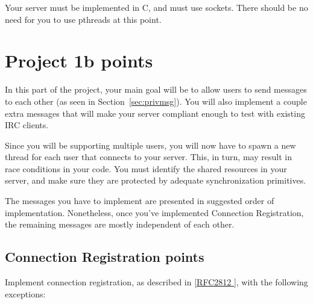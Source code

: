 \documentclass[10pt]{article}
\newcommand{\RFCsection}[2]{\href{http://tools.ietf.org/html/rfc#1\#section-#2}{[RFC#1 \textsection #2]}}
\newcommand{\points}[1]{{\sffamily\mdseries\guillemotleft #1 points\guillemotright{}}}
\begin{document}
Your server must be implemented in C, and must use sockets. There should be no need for you to use pthreads at this point.

\pagebreak

\section{Project 1b \points{100}}
\label{sec:proj1b}

In this part of the project, your main goal will be to allow users to send messages to each other (as seen in Section~\ref{sec:privmsg}). You will also implement a couple extra messages that will make your server compliant enough to test with existing IRC clients.

Since you will be supporting multiple users, you will now have to spawn a new thread for each user that connects to your server. This, in turn, may result in race conditions in your code. You must identify the shared resources in your server, and make sure they are protected by adequate synchronization primitives.

The messages you have to implement are presented in suggested order of implementation. Nonetheless, once you've implemented Connection Registration, the remaining messages are mostly independent of each other.

\subsection{Connection Registration \points{40}}

Implement connection registration, as described in \RFCsection{2812}{3.1}, with the following exceptions:
\end{document}
